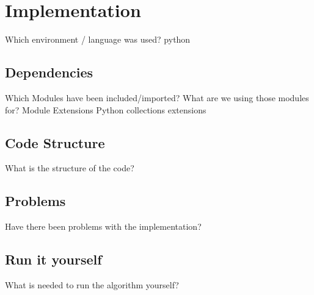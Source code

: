 \chapter{Implementation}
  Which environment / language was used?\newline
  python\newline
\section{Dependencies}
  Which Modules have been included/imported?\newline
  What are we using those modules for?\newline
  Module Extensions\newline
    Python collections extensions\newline
\section{Code Structure}
  What is the structure of the code?\newline
\section{Problems}
  Have there been problems with the implementation?\newline
\section{Run it yourself}
  What is needed to run the algorithm yourself?\newline
